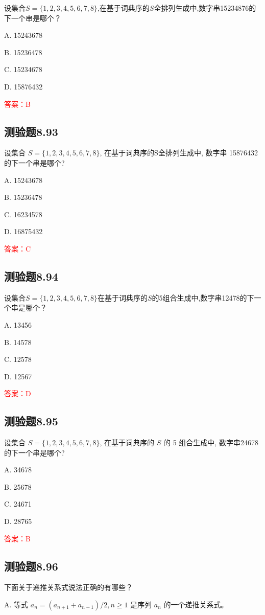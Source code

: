 \documentclass[UTF8, heading=true]{ctexart}
\begin{document}
设集合$S=\{1,2,3,4,5,6,7,8\}$,在基于词典序的$S$全排列生成中,数字串15234876的下一个串是哪个？

A. 15243678

B. 15236478

C. 15234678

D. 15876432

\textcolor{red}{答案：B}

\subsection{测验题8.93}

设集合 $S=\{1,2,3,4,5,6,7,8\}$, 在基于词典序的S全排列生成中, 数字串 15876432 的下一个串是哪个?

A. 15243678

B. 15236478

C. 16234578

D. 16875432

\textcolor{red}{答案：C}

\subsection{测验题8.94}
设集合$S = \{1,2,3,4,5,6,7,8\}$在基于词典序的$S$的5组合生成中,数字串12478的下一个串是哪个？

A. 13456

B. 14578

C. 12578

D. 12567

\textcolor{red}{答案：D}


\subsection{测验题8.95}

设集合 $S=\{1,2,3,4,5,6,7,8\}$, 在基于词典序的 $S$ 的 5 组合生成中, 数字串24678的下一个串是哪个?

A. 34678

B. 25678

C. 24671

D. 28765

\textcolor{red}{答案：B}

\subsection{测验题8.96}

下面关于递推关系式说法正确的有哪些？

A. 等式 $a_n=\left(a_{n+1}+a_{n-1}\right) / 2, n \geq 1$ 是序列 $a_n$ 的一个递推关系式。
\end{document}
